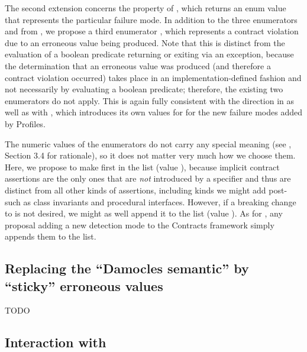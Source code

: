 The second extension concerns the  property of , which returns an enum value that represents the particular failure mode. In addition to the three enumerators  and  from \cite{P2900R13}, we propose a third enumerator , which represents a contract violation due to an erroneous value being produced. Note that this is distinct from the evaluation of a boolean predicate returning  or exiting via an exception, because the determination that an erroneous value was produced (and therefore a contract violation occurred) takes place in an implementation-defined fashion and not necessarily by evaluating a boolean predicate; therefore, the existing two enumerators do not apply. This is again fully consistent with the direction in \cite{P3100R1} as well as with \cite{P3081R1}, which introduces its own values for  for the new failure modes added by Profiles.

The numeric values of the enumerators do not carry any special meaning (see \cite{P3327R0}, Section 3.4 for rationale), so it does not matter very much how we choose them. Here, we propose to make  first in the list (value  ), because implicit contract assertions are the only ones that are \emph{not} introduced by a specifier and thus are distinct from all other kinds of assertions, including kinds we might add post-\cite{P2900R13} such as class invariants and procedural interfaces. However, if a breaking change to \cite{P2900R13} is not desired, we might as well  append it to the list (value ). As for , any proposal adding a new detection mode to the Contracts framework simply appends them to the list.

\subsection{Replacing the ``Damocles semantic'' by ``sticky'' erroneous values}
\label{damocles}

TODO


\subsection{Interaction with }

